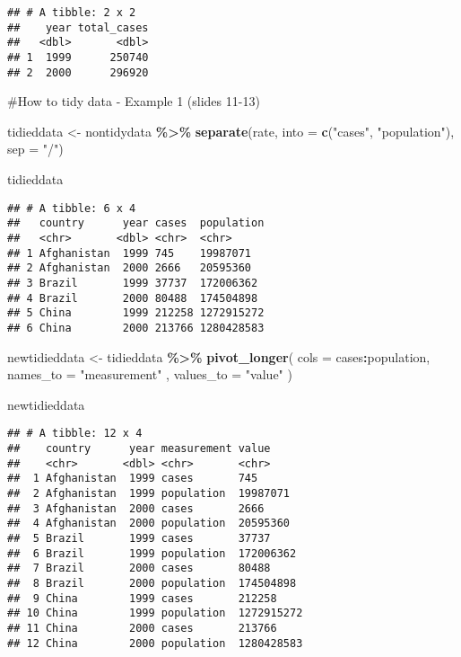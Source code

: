 \documentclass[
]{article}
\newenvironment{Shaded}{\begin{snugshade}}{\end{snugshade}}
\newcommand{\AttributeTok}[1]{\textcolor[rgb]{0.13,0.29,0.53}{#1}}
\newcommand{\FunctionTok}[1]{\textcolor[rgb]{0.13,0.29,0.53}{\textbf{#1}}}
\newcommand{\NormalTok}[1]{#1}
\newcommand{\OtherTok}[1]{\textcolor[rgb]{0.56,0.35,0.01}{#1}}
\newcommand{\SpecialCharTok}[1]{\textcolor[rgb]{0.81,0.36,0.00}{\textbf{#1}}}
\newcommand{\StringTok}[1]{\textcolor[rgb]{0.31,0.60,0.02}{#1}}
\begin{document}
\begin{verbatim}
## # A tibble: 2 x 2
##    year total_cases
##   <dbl>       <dbl>
## 1  1999      250740
## 2  2000      296920
\end{verbatim}

\#How to tidy data - Example 1 (slides 11-13)

\begin{Shaded}
\begin{Highlighting}[]
\NormalTok{tidieddata }\OtherTok{\textless{}{-}}\NormalTok{ nontidydata }\SpecialCharTok{\%\textgreater{}\%}
 \FunctionTok{separate}\NormalTok{(rate, }\AttributeTok{into =} \FunctionTok{c}\NormalTok{(}\StringTok{"cases"}\NormalTok{,}
 \StringTok{"population"}\NormalTok{),}
 \AttributeTok{sep =} \StringTok{"/"}\NormalTok{)}

\NormalTok{tidieddata}
\end{Highlighting}
\end{Shaded}

\begin{verbatim}
## # A tibble: 6 x 4
##   country      year cases  population
##   <chr>       <dbl> <chr>  <chr>     
## 1 Afghanistan  1999 745    19987071  
## 2 Afghanistan  2000 2666   20595360  
## 3 Brazil       1999 37737  172006362 
## 4 Brazil       2000 80488  174504898 
## 5 China        1999 212258 1272915272
## 6 China        2000 213766 1280428583
\end{verbatim}

\begin{Shaded}
\begin{Highlighting}[]
\NormalTok{newtidieddata }\OtherTok{\textless{}{-}}\NormalTok{ tidieddata }\SpecialCharTok{\%\textgreater{}\%}
 \FunctionTok{pivot\_longer}\NormalTok{(}
 \AttributeTok{cols =}\NormalTok{ cases}\SpecialCharTok{:}\NormalTok{population,}
 \AttributeTok{names\_to =} \StringTok{"measurement"}
\NormalTok{,}
 \AttributeTok{values\_to =} \StringTok{"value"}
\NormalTok{ )}

\NormalTok{newtidieddata}
\end{Highlighting}
\end{Shaded}

\begin{verbatim}
## # A tibble: 12 x 4
##    country      year measurement value     
##    <chr>       <dbl> <chr>       <chr>     
##  1 Afghanistan  1999 cases       745       
##  2 Afghanistan  1999 population  19987071  
##  3 Afghanistan  2000 cases       2666      
##  4 Afghanistan  2000 population  20595360  
##  5 Brazil       1999 cases       37737     
##  6 Brazil       1999 population  172006362 
##  7 Brazil       2000 cases       80488     
##  8 Brazil       2000 population  174504898 
##  9 China        1999 cases       212258    
## 10 China        1999 population  1272915272
## 11 China        2000 cases       213766    
## 12 China        2000 population  1280428583
\end{verbatim}
\end{document}

